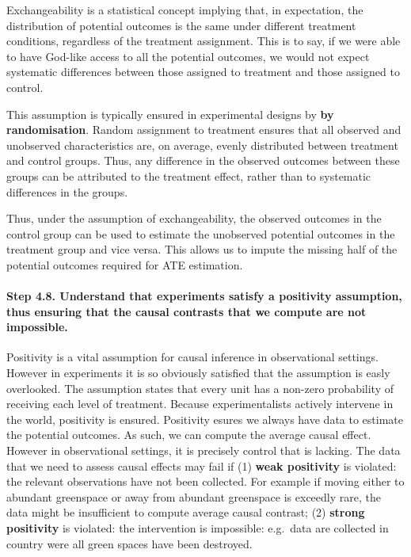 \documentclass[
  singlecolumn]{article}
\let\oldparagraph\paragraph
\renewcommand{\paragraph}[1]{\oldparagraph{#1}\mbox{}}
\begin{document}
Exchangeability is a statistical concept implying that, in expectation,
the distribution of potential outcomes is the same under different
treatment conditions, regardless of the treatment assignment. This is to
say, if we were able to have God-like access to all the potential
outcomes, we would not expect systematic differences between those
assigned to treatment and those assigned to control.

This assumption is typically ensured in experimental designs by
\textbf{by randomisation}. Random assignment to treatment ensures that
all observed and unobserved characteristics are, on average, evenly
distributed between treatment and control groups. Thus, any difference
in the observed outcomes between these groups can be attributed to the
treatment effect, rather than to systematic differences in the groups.

Thus, under the assumption of exchangeability, the observed outcomes in
the control group can be used to estimate the unobserved potential
outcomes in the treatment group and vice versa. This allows us to impute
the missing half of the potential outcomes required for ATE estimation.

\hypertarget{step-4.8.-understand-that-experiments-satisfy-a-positivity-assumption-thus-ensuring-that-the-causal-contrasts-that-we-compute-are-not-impossible.}{%
\paragraph{\texorpdfstring{\textbf{Step 4.8. Understand that experiments
satisfy a positivity assumption, thus ensuring that the causal contrasts
that we compute are not
impossible.}}{Step 4.8. Understand that experiments satisfy a positivity assumption, thus ensuring that the causal contrasts that we compute are not impossible.}}\label{step-4.8.-understand-that-experiments-satisfy-a-positivity-assumption-thus-ensuring-that-the-causal-contrasts-that-we-compute-are-not-impossible.}}

Positivity is a vital assumption for causal inference in observational
settings. However in experiments it is so obviously satisfied that the
assumption is easly overlooked. The assumption states that every unit
has a non-zero probability of receiving each level of treatment. Because
experimentalists actively intervene in the world, positivity is ensured.
Positivity esures we always have data to estimate the potential
outcomes. As such, we can compute the average causal effect. However in
observational settings, it is precisely control that is lacking. The
data that we need to assess causal effects may fail if (1) \textbf{weak
positivity} is violated: the relevant observations have not been
collected. For example if moving either to abundant greenspace or away
from abundant greenspace is exceedly rare, the data might be
insufficient to compute average causal contrast; (2) \textbf{strong
positivity} is violated: the intervention is impossible: e.g.~data are
collected in country were all green spaces have been destroyed.
\end{document}
